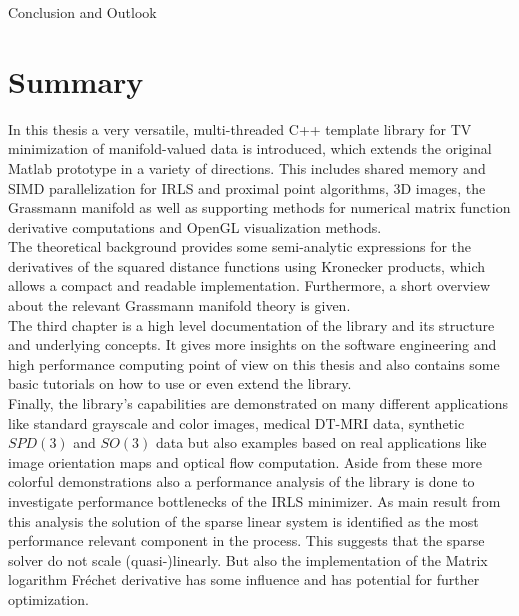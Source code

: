 \begin{chapter}{Conclusion and Outlook}
\label{ch:conclusion}

\section{Summary}
In this thesis a very versatile, multi-threaded C++ template library for 
TV minimization of manifold-valued data is introduced, which extends the original Matlab prototype in a variety of directions. This includes shared memory and SIMD parallelization for IRLS and 
proximal point algorithms, 3D images, 
the Grassmann manifold as well as supporting methods for numerical matrix function derivative computations and OpenGL visualization methods. \\

The theoretical background provides some semi-analytic expressions for the derivatives of the squared
distance functions using Kronecker products, which allows a compact and readable implementation.
Furthermore, a short overview about the relevant Grassmann manifold theory is given.\\

The third chapter is a high level documentation of the library and its structure and underlying concepts. It
gives more insights on the software engineering and high performance computing point of view on this thesis 
and also contains some basic tutorials on how to use or even extend the library.\\

Finally, the library's capabilities are demonstrated on many different applications like standard grayscale and color images,
medical DT-MRI data, synthetic $SPD(3)$ and $SO(3)$ data but also examples based on real applications like image orientation
maps and optical flow computation. Aside from these more colorful demonstrations also a performance analysis of the 
library is done to investigate performance bottlenecks of the IRLS minimizer. As main result from this analysis the solution 
of the sparse linear system is identified as the most performance relevant component in the process. This suggests
that the sparse solver do not scale (quasi-)linearly. But also the implementation of the Matrix logarithm Fr\'{e}chet derivative 
has some influence and has potential for further optimization.\\


\end{chapter}
